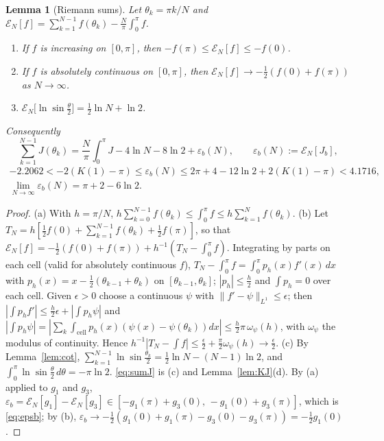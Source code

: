 \documentclass[11pt,a4paper]{article}
\theoremstyle{plain}
\newtheorem{lemma}[theorem]{Lemma}
\theoremstyle{definition}
\numberwithin{equation}{section}
\begin{document}
\begin{lemma}[Riemann sums]\label{lem:riemann}
Let $\theta_k=\pi k/N$ and $\mathcal E_N[f]=\sum_{k=1}^{N-1}f(\theta_k)-\frac N\pi\int_0^\pi f$.
\begin{enumerate}
\item[(a)] If $f$ is increasing on $[0,\pi]$, then $-f(\pi)\le\mathcal E_N[f]\le-f(0)$.
\item[(b)] If $f$ is absolutely continuous on $[0,\pi]$, then $\mathcal E_N[f]\to-\frac12(f(0)+f(\pi))$ as $N\to\infty$.
\item[(c)] $\mathcal E_N\big[\ln\sin\frac{\theta}2\big]=\frac12\ln N+\ln2$.
\end{enumerate}
Consequently
\begin{equation}\label{eq:sumJ}
\sum_{k=1}^{N-1}J(\theta_k)=\frac N\pi\int_0^\pi J-4\ln N-8\ln2+\varepsilon_b(N),\qquad\varepsilon_b(N):=\mathcal E_N[J_b],
\end{equation}
\begin{equation}\label{eq:epsb}
\begin{gathered}-2.2062<-2(K(1)-\pi)\le\varepsilon_b(N)\le2\pi+4-12\ln2+2(K(1)-\pi)<4.1716,\\ \lim_{N\to\infty}\varepsilon_b(N)=\pi+2-6\ln2 .\end{gathered}
\end{equation}
\end{lemma}
\begin{proof}
(a) With $h=\pi/N$, $h\sum_{k=0}^{N-1}f(\theta_k)\le\int_0^\pi f\le h\sum_{k=1}^{N}f(\theta_k)$.
(b) Let $T_N=h[\frac12f(0)+\sum_{k=1}^{N-1}f(\theta_k)+\frac12f(\pi)]$, so that $\mathcal E_N[f]=-\frac12(f(0)+f(\pi))+h^{-1}(T_N-\int_0^\pi f)$. Integrating by parts on each cell (valid for absolutely continuous $f$), $T_N-\int_0^\pi f=\int_0^\pi p_h(x)f'(x)\,dx$ with $p_h(x)=x-\frac12(\theta_{k-1}+\theta_k)$ on $[\theta_{k-1},\theta_k]$; $|p_h|\le\frac h2$ and $\int p_h=0$ over each cell. Given $\epsilon>0$ choose a continuous $\psi$ with $\|f'-\psi\|_{L^1}\le\epsilon$; then $|\int p_hf'|\le\frac h2\epsilon+|\int p_h\psi|$ and $|\int p_h\psi|=|\sum_k\int_{\mathrm{cell}}p_h(x)(\psi(x)-\psi(\theta_k))dx|\le\frac{h}{2}\pi\,\omega_\psi(h)$, with $\omega_\psi$ the modulus of continuity. Hence $h^{-1}|T_N-\int f|\le\frac\epsilon2+\frac\pi2\omega_\psi(h)\to\frac\epsilon2$.
(c) By Lemma~\ref{lem:cot}, $\sum_{k=1}^{N-1}\ln\sin\frac{\theta_k}{2}=\frac12\ln N-(N-1)\ln2$, and $\int_0^\pi\ln\sin\frac\theta2\,d\theta=-\pi\ln2$.
\eqref{eq:sumJ} is (c) and Lemma~\ref{lem:KJ}(d). By (a) applied to $g_1$ and $g_3$, $\varepsilon_b=\mathcal E_N[g_1]-\mathcal E_N[g_3]\in[-g_1(\pi)+g_3(0),\,-g_1(0)+g_3(\pi)]$, which is \eqref{eq:epsb}; by (b), $\varepsilon_b\to-\frac12(g_1(0)+g_1(\pi)-g_3(0)-g_3(\pi))=-\frac12g_1(0)$.
\end{proof}
\end{document}
